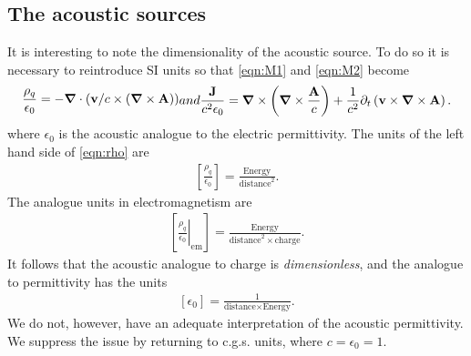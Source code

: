 \documentclass[10pt, fleqn,draft,showtrims,oldfontcommands]{article} %
\newcommand{\sub}[1]{\begin{subequations}#1\end{subequations}}
\newcommand{\eqnref}[1]{\ref{eqn:#1}}
\newcommand{\lr}[1]{\left( #1 \right)}
\newcommand{\lrsquare}[1]{\left[ #1 \right]}
\renewcommand{\d}{\partial}
\newcommand{\del}{\nabla}
\newcommand{\vdel}{ \mbox{\boldmath $\del$}}
\newcommand{\given}[2]{ \left.{#1}\right|_{#2}  }
\newcommand{\dt}{{\d_t}}
\newcommand{\vJ}{\vect J}
\newcommand{\vect}[1]{\mathbf{#1}}
\newcommand{\vA}{\textbf{A}}
\newcommand{\vv}{\textbf{v}}
\begin{document}
\subsection{The acoustic sources}



It is interesting to note the dimensionality of the acoustic source.
To do so it is necessary to reintroduce SI units so that \eqnref{M1} and \eqnref{M2} become
\sub{
\begin{align}
  \frac{\rho_q}{\epsilon_0} = -\vdel \cdot\lr{ \vv/c \times \lr{\vdel \times \vA}} \label{eqn:rho}
\end{align}
and 
\begin{align}
 \frac{\vJ}{c^2 \epsilon_0} = \vdel \times \lr{\vdel\times \frac{\vA}{c}} + \frac{1}{c^2}\dt \lr{ \vv \times \vdel \times \vA}.\label{eqn:vJ}
\end{align}
}
where $\epsilon_0$ is the acoustic analogue to the electric permittivity.
The units of the left hand side of \eqnref{rho} are
\begin{align}
  \lrsquare{\frac{\rho_q}{\epsilon_0}} = \frac{\text{Energy}}{\text{distance}^2}.
\end{align}
The analogue units in electromagnetism are 
\begin{align}
\lrsquare{\given { \frac{\rho_q}{\epsilon_0}}{\text{em}}} =  \frac{\text{Energy}}{\text{distance}^2\times \text{charge}}.
\end{align}
It follows that the acoustic analogue to charge is {\em dimensionless},
and the analogue to permittivity has the units 
\begin{align}
\lrsquare{\epsilon_0} = \frac{1}{\text{distance}\times\text{Energy}}.
\end{align}
We do not, however, have an adequate interpretation of the acoustic permittivity.
We suppress the issue by  returning to c.g.s. units, where $c= \epsilon_0 = 1$.
\end{document}
